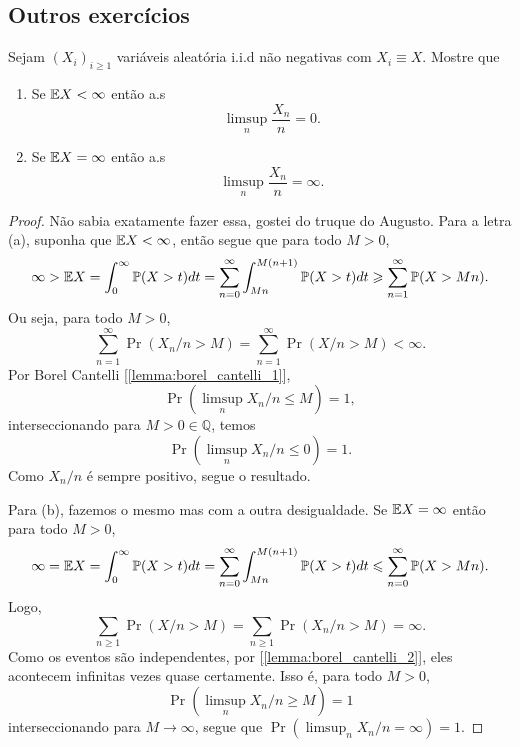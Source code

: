 \subsection{Outros exercícios}
\begin{exercise}
	Sejam $(X_i)_{i \geq 1}$ variáveis aleatória i.i.d não negativas com
	$X_i \equiv X$. Mostre que
	\begin{enumerate}[label=(\alph*)]
		\item Se $\mathbb{E} X < \infty$ então a.s
			\[
				\limsup_n \frac{X_n}{n} = 0.
			\]
		\item Se $\mathbb{E} X = \infty$ então a.s
			\[
				\limsup_n \frac{X_n}{n} = \infty.
			\]
	\end{enumerate}
\end{exercise}
\begin{proof}
	Não sabia exatamente fazer essa, gostei do truque do Augusto.
	Para a letra (a), suponha que $\mathbb{E} X < \infty$, então segue que para
	todo $M > 0$,
	\[
		\infty > \mathbb{E} X = \int_0^\infty \mathbb{P}(X > t) dt = \sum_{n = 0}^\infty
		\int_{Mn}^{M(n+1)} \mathbb{P}(X > t) dt \geqslant \sum_{n = 1}^\infty \mathbb{P}(X > Mn).
	\]
	Ou seja, para todo $M > 0$,
	\[
		\sum_{n = 1}^\infty \Pr(X_n/n > M) =  \sum_{n = 1}^\infty \Pr(X/n >
		M) < \infty.
	\]
	Por Borel Cantelli [\ref{lemma:borel_cantelli_1}],
	\[
		\Pr(\limsup_n X_n/n \leq M) = 1,
	\]
	interseccionando para $M > 0 \in \mathbb{Q}$, temos
	\[
		\Pr(\limsup_n X_n/n \leq 0) = 1.
	\]
	Como $X_n/n$ é sempre positivo, segue o resultado.

	Para (b), fazemos o mesmo mas com a outra desigualdade. Se $\mathbb{E} X =
	\infty$ então para todo $M > 0$,
	\[
		\infty = \mathbb{E} X = \int_0^\infty \mathbb{P}(X > t) dt = \sum_{n = 0}^\infty
		\int_{Mn}^{M(n+1)} \mathbb{P}(X > t) dt \leqslant \sum_{n = 0}^\infty \mathbb{P}(X > Mn).
	\]
	Logo,
	\[
		\sum_{n \geq 1} \Pr(X/n > M) = \sum_{n \geq 1} \Pr(X_n/n > M) = \infty.
	\]
	Como os eventos são independentes, por
	[\ref{lemma:borel_cantelli_2}], eles acontecem
	infinitas vezes quase certamente. Isso é, para todo $M > 0$,
	\[
		\Pr(\limsup_n X_n/n \geq M) = 1
	\]
	interseccionando para $M \to \infty$, segue que $\Pr(\limsup_n X_n/n
	= \infty) = 1$.
\end{proof}


\pagebreak
